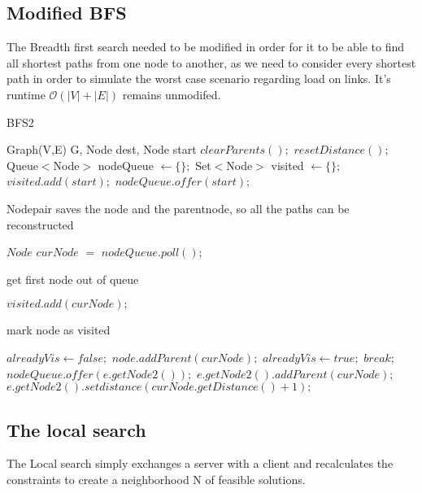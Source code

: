 \documentclass [12pt]{article}
\begin{document}
\subsection{Modified BFS}
The Breadth first search needed to be modified in order for it to be able to find all shortest paths
from one node to another, as we need to consider every shortest path in order to simulate
the worst case scenario regarding load on links. It's runtime $\mathcal O(|V| + |E|)$ remains unmodifed.

\begin{algorithm}[H]
  \caption{BFS2}
  \begin{algorithmic}[2]
    \Require Graph(V,E) G, Node dest, Node start
    \State $clearParents();$
    \State $resetDistance();$
    \State Queue$<$Node$>$ nodeQueue $\gets \{\};$
    \State Set$<$Node$>$ visited $\gets \{\};$
    \State $visited.add(start);$
    \State $nodeQueue.offer(start);$ \Comment \begin{itshape} Nodepair saves the node and the parentnode,
    so all the paths can be reconstructed\end{itshape}
  \State $Node$ $curNode$ $=$ $nodeQueue.poll();$ \Comment \begin{itshape} get first node out of queue\end{itshape}
  \State $visited.add(curNode);$ \Comment \begin{itshape} mark node as visited\end{itshape}            
    \EndIf
    \State $alreadyVis \gets false;$
    \State $node.addParent(curNode);$
    \State $alreadyVis \gets true;$
    \State $break;$
    \EndFor
    \State $nodeQueue.offer(e.getNode2());$
    \State $e.getNode2().addParent(curNode);$
    \State $e.getNode2().setdistance(curNode.getDistance()+1);$
    \EndIf
    \EndIf
    \EndIf
    \EndFor
    \EndWhile
  \end{algorithmic}
\end{algorithm}
\subsection{The local search}
The Local search simply exchanges a server with a client and recalculates the constraints to create a neighborhood N of feasible solutions.
\end{document}

